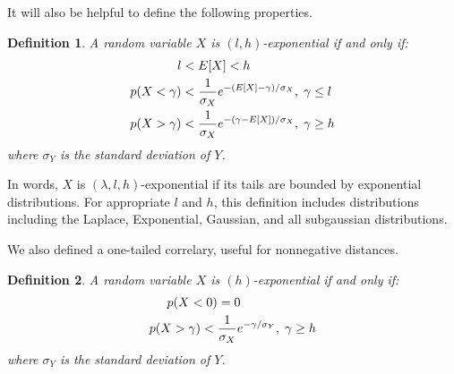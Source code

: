 \documentclass[]{article}
\newtheorem{definition}{Definition}[section]
\begin{document}
It will also be helpful to define the following properties.

\begin{definition}
A random variable $X$ is $(l, h)$-exponential if and only if:
\begin{align}
    l < \hspace{1mm} & E[X] < h \\
    p(X < \gamma) < \hspace{1mm} & \frac{1}{\sigma_X} e^{-(E[X] - \gamma) / \sigma_X}, \hspace{1mm} \gamma \le l \\
    p(X > \gamma) < \hspace{1mm} & \frac{1}{\sigma_X} e^{-(\gamma - E[X]) / \sigma_X}, \hspace{1mm} \gamma \ge h
\end{align}
where $\sigma_Y$ is the standard deviation of $Y$.
\end{definition}
In words, $X$ is $(\lambda, l, h)$-exponential if its tails are bounded by exponential distributions. For appropriate $l$ and $h$, this definition includes distributions including the Laplace, Exponential, Gaussian, and all subgaussian distributions.

We also defined a one-tailed correlary, useful for nonnegative distances.

\begin{definition}
A random variable $X$ is $(h)$-exponential if and only if:
\begin{align}
    p(X < 0) &= 0 \\
    p(X > \gamma) < \hspace{1mm} & \frac{1}{\sigma_X} e^{-\gamma / \sigma_Y}, \hspace{1mm} \gamma \ge h
\end{align}
where $\sigma_Y$ is the standard deviation of $Y$.
\end{definition}
\end{document}
